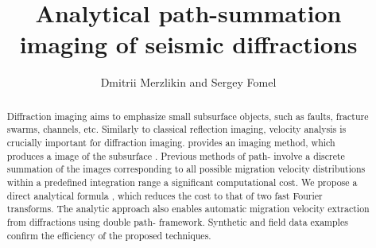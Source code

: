 \title{Analytical path-summation imaging of seismic diffractions}
\author{Dmitrii Merzlikin and Sergey Fomel}



\address{
Bureau of Economic Geology \\
John A. and Katherine G. Jackson School of Geosciences \\
The University of Texas at Austin \\
University Station, Box X \\
Austin, TX 78713-8924 \\
dmitrii.merzlikin@utexas.edu
}

\maketitle

\begin{abstract}
Diffraction imaging aims to emphasize small subsurface objects, such as faults, fracture swarms, channels, etc.
Similarly to classical reflection imaging, 
velocity analysis is crucially important for  diffraction imaging.  
provides an imaging method, which produces a
image of the subsurface . 
Previous methods of path-  involve a discrete summation of the
images corresponding to all possible migration velocity distributions within a predefined
integration range  a significant computational cost. 
We propose a direct analytical formula , which reduces the cost 
to that of  two fast Fourier transforms.
The analytic approach also enables automatic
migration velocity extraction from diffractions using double path- framework.
Synthetic and field data examples confirm the efficiency 
of the proposed techniques.
\end{abstract}  

